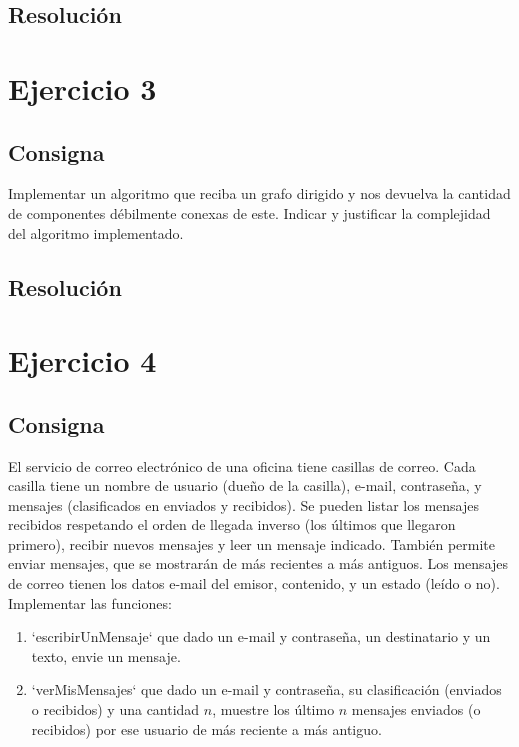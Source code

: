 \documentclass{article}
\begin{document}
\subsection{Resolución}

\section{Ejercicio 3}

\subsection{Consigna}

Implementar un algoritmo que reciba un grafo dirigido y nos devuelva la cantidad de componentes débilmente conexas de este. Indicar y justificar la complejidad del algoritmo implementado.

\subsection{Resolución}

\section{Ejercicio 4}

\subsection{Consigna}

El servicio de correo electrónico de una oficina tiene casillas de correo. Cada casilla tiene un nombre de usuario (dueño de la casilla), e-mail, contraseña, y mensajes (clasificados en enviados y recibidos). Se pueden listar los mensajes recibidos
respetando el orden de llegada inverso (los últimos que llegaron primero), recibir nuevos mensajes y leer un mensaje indicado. También permite enviar mensajes, que se mostrarán de más recientes a más antiguos. Los mensajes de correo tienen los datos e-mail del emisor, contenido, y un estado (leído o no). Implementar las funciones:

\begin{enumerate}[label=\alph*)]
    \item `escribirUnMensaje` que dado un e-mail y contraseña, un destinatario y un texto, envie un mensaje.
    \item `verMisMensajes` que dado un e-mail y contraseña, su clasificación (enviados o recibidos) y una cantidad $n$, muestre los último $n$ mensajes enviados (o recibidos) por ese usuario de más reciente a más antiguo.
\end{enumerate}
\end{document}
